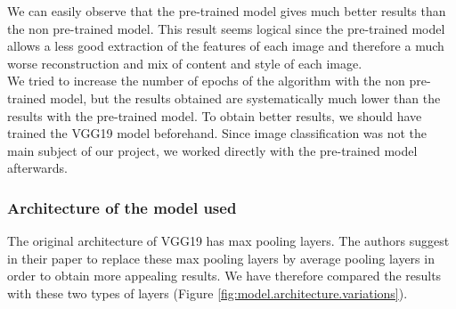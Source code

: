 \documentclass[twocolumn,superscriptaddress,aps, floatfix]{revtex4-1}
\begin{document}
    We can easily observe that the pre-trained model gives much better results than the non pre-trained model. This result seems logical since the pre-trained model allows a less good extraction of the features of each image and therefore a much worse reconstruction and mix of content and style of each image.\\
    
    We tried to increase the number of epochs of the algorithm with the non pre-trained model, but the results obtained are systematically much lower than the results with the pre-trained model. To obtain better results, we should have trained the VGG19 model beforehand. Since image classification was not the main subject of our project, we worked directly with the pre-trained model afterwards.
    
    \subsubsection{Architecture of the model used}
    
    The original architecture of VGG19 has max pooling layers. The authors suggest in their paper to replace these max pooling layers by average pooling layers in order to obtain more appealing results. We have therefore compared the results with these two types of layers (Figure \ref{fig:model.architecture.variations}).
    
\end{document}
